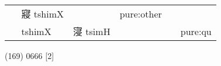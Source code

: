 \documentclass[14pt,a4paper]{scrartcl}
\begin{document}
\begin{longtable}[c]{@{}llllll@{}}
\begin{minipage}[t]{0.14\columnwidth}
\strut\end{minipage} &
\begin{minipage}[t]{0.14\columnwidth}\raggedright\strut
寢 tshimX
\strut\end{minipage} &
\begin{minipage}[t]{0.14\columnwidth}\raggedright\strut
\strut\end{minipage} &
\begin{minipage}[t]{0.14\columnwidth}\raggedright\strut
pure:other
\strut\end{minipage}\tabularnewline
\begin{minipage}[t]{0.14\columnwidth}\raggedright\strut
𡩠
\strut\end{minipage} &
\begin{minipage}[t]{0.14\columnwidth}\raggedright\strut
tshimX
\strut\end{minipage} &
\begin{minipage}[t]{0.14\columnwidth}\raggedright\strut
寖 tsimH
\strut\end{minipage} &
\begin{minipage}[t]{0.14\columnwidth}\raggedright\strut
\strut\end{minipage} &
\begin{minipage}[t]{0.14\columnwidth}\raggedright\strut
\strut\end{minipage} &
\begin{minipage}[t]{0.14\columnwidth}\raggedright\strut
pure:qu
\strut\end{minipage}\tabularnewline
\bottomrule
\end{longtable}

(169) 0666 {[}2{]}
\end{document}
